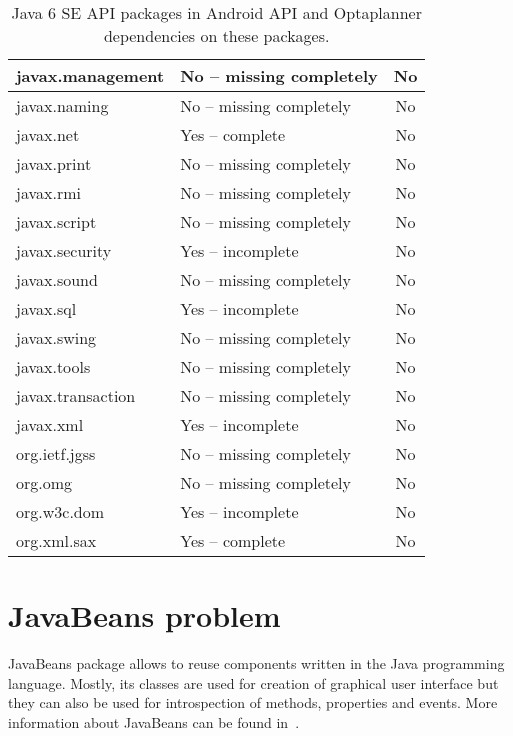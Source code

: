 \begin {table}[h!]
\begin{tabular}{|l|l|c|}
        javax.management      & No -- missing completely  & No  \\ \hline
        javax.naming          & No -- missing completely  & No  \\ \hline
        javax.net             & Yes -- complete           & No  \\ \hline
        javax.print           & No -- missing completely  & No  \\ \hline
        javax.rmi             & No -- missing completely  & No  \\ \hline
        javax.script          & No -- missing completely  & No  \\ \hline
        javax.security        & Yes -- incomplete         & No  \\ \hline
        javax.sound           & No -- missing completely  & No  \\ \hline
        javax.sql             & Yes -- incomplete         & No  \\ \hline
        javax.swing           & No -- missing completely  & No  \\ \hline
        javax.tools           & No -- missing completely  & No  \\ \hline
        javax.transaction     & No -- missing completely  & No  \\ \hline
        javax.xml             & Yes -- incomplete         & No  \\ \hline
        org.ietf.jgss         & No -- missing completely  & No  \\ \hline
        org.omg               & No -- missing completely  & No  \\ \hline
        org.w3c.dom           & Yes -- incomplete         & No  \\ \hline
        org.xml.sax           & Yes -- complete           & No  \\ \hline
    \end{tabular}
    \centering
    \caption{Java 6 SE API packages in Android API and Optaplanner dependencies on these packages.}
    \label{ApiDiffTable}
\end{table}

\section{JavaBeans problem}\label{JavaBeans}
JavaBeans package allows to reuse components written in the Java programming language. Mostly, its classes are used for
creation of graphical user interface but they can also be used for introspection of methods, properties and events.
More information about JavaBeans can be found in~\cite{Beans}.

